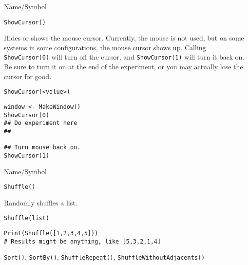 \rl




\begin{desc}{Name/Symbol}
\item[Name/Symbol]  	\verb+ShowCursor()+

\item[Description] Hides or shows the mouse cursor.  Currently, the
  mouse is not used, but on some systems in some configurations, the
  mouse cursor shows up.  Calling \verb+ShowCursor(0)+ will turn off the
  cursor, and \verb+ShowCursor(1)+ will turn it back on.  Be sure to turn it
  on at the end of the experiment, or you may actually lose the cursor
  for good.

\item[Usage]
\begin{verbatim}
ShowCursor(<value>)
\end{verbatim}

\item[Example]
\begin{verbatim}
window <- MakeWindow()
ShowCursor(0)
## Do experiment here
##

## Turn mouse back on.
ShowCursor(1)
\end{verbatim}
\item[See Also] 
\end{desc}

\rl




\begin{desc}{Name/Symbol}
\item[Name/Symbol] 	\verb+Shuffle()+

\item[Description] 	Randomly shuffles a list.

\item[Usage]    
\begin{verbatim}
Shuffle(list)
\end{verbatim}

\item[Example]
\begin{verbatim}
Print(Shuffle([1,2,3,4,5]))
# Results might be anything, like [5,3,2,1,4]
\end{verbatim}

\item[See Also]    	\verb+Sort()+, \verb+SortBy()+, \verb+ShuffleRepeat()+,
                    \verb+ShuffleWithoutAdjacents()+
\end{desc}

\rl




